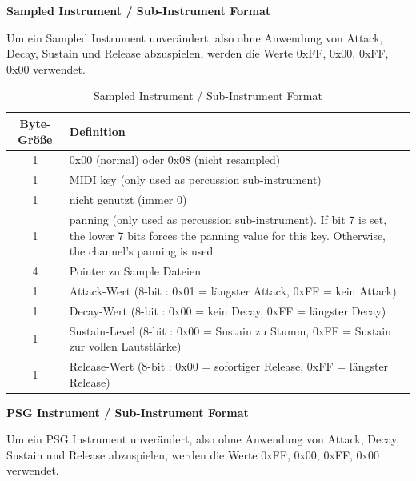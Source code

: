 \documentclass[11pt,a4paper]{scrartcl}
\newcommand{\paratitle}[1] {
    \vspace{5mm}
    \large \textbf{#1} \normalsize
    \vspace{2mm}\newline
}
\begin{document}
\paratitle{Sampled Instrument / Sub-Instrument Format}
Um ein Sampled Instrument unver\"andert, also ohne Anwendung von Attack, Decay, Sustain und Release abzuspielen, werden die Werte 0xFF, 0x00, 0xFF, 0x00 verwendet.

\begin{table}[h]
    \centering
    \begin{tabular}{ c | p{15cm} }
        \textbf{Byte-Gr\"o{\ss}e} & \textbf{Definition} \\
        \hline
				1 & 0x00 (normal) oder 0x08 (nicht resampled) \\
				\hline
        1 & MIDI key (only used as percussion sub-instrument) \\
				\hline
        1 & nicht genutzt (immer 0) \\
				\hline
        1 & panning (only used as percussion sub-instrument).
         If bit 7 is set, the lower 7 bits forces the panning value for this key. Otherwise, the channel's panning is used \\
				\hline
        4 & Pointer zu Sample Dateien \\
				\hline
				1 & Attack-Wert (8-bit : 0x01 = l\"angster Attack, 0xFF = kein Attack) \\
        \hline
        1 & Decay-Wert (8-bit : 0x00 = kein Decay, 0xFF = l\"angster Decay) \\ 
        \hline
				1 & Sustain-Level (8-bit : 0x00 = Sustain zu Stumm, 0xFF = Sustain zur vollen Lautstl\"arke) \\
        \hline
        1 & Release-Wert (8-bit : 0x00 = sofortiger Release, 0xFF = l\"angster Release) \\
    \end{tabular}
    \caption{Sampled Instrument / Sub-Instrument Format}
    \label{table:SampleInstrument}
\end{table}


\newpage
\paratitle{PSG Instrument / Sub-Instrument Format}
Um ein PSG Instrument unver\"andert, also ohne Anwendung von Attack, Decay, Sustain und Release abzuspielen, werden die Werte 0xFF, 0x00, 0xFF, 0x00 verwendet.
\end{document}
